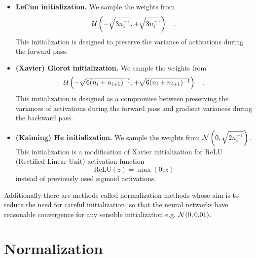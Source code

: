 \documentclass{myclass}
\begin{document}
\begin{itemize}
   \item \textbf{LeCun initialization.} We sample the weights from
   \[
      \mathcal{U}\left(-\sqrt{3n_{i}^{-1}}, +\sqrt{3n_{i}^{-1}}\right) \quad.
   \]
   This initialization is designed to preserve the variance of activations during the forward pass.
   
   \item \textbf{(Xavier) Glorot initialization.} We sample the weights from
   \[
      \mathcal{U}\left(-\sqrt{6(n_{i} + n_{i+1})^{-1}}, +\sqrt{6(n_{i} + n_{i+1})^{-1}}\right) \quad.
   \]
   This initialization is designed as a compromise between preserving the variances of activations
   during the forward pass and gradient variances during the backward pass.
   
   \item \textbf{(Kaiming) He initialization.} We sample the weights from \(\mathcal{N}\left(0, \sqrt{2
   n_{i}^{-1}}\right)\). This initialization is a modification of Xavier initialization for ReLU
   (Rectified Linear Unit) activation function
   \[\boxed{
      \text{ReLU}(z) = \max(0, z)
   }
   \]
   instead of previously used sigmoid activations.
\end{itemize}

Additionally there are methods called normalization methods whose aim is to reduce the need for
careful initialization, so that the neural networks have reasonable convergence for any sensible
initialization e.g. \(\mathcal{N}(0,0.01)\).


\section{Normalization}
\end{document}
